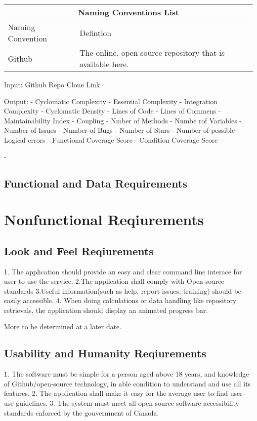 \documentclass{article}
\begin{document}
\begin{tabular}{ |p{6cm}||p{6cm}|  }
 \hline
 \multicolumn{2}{|c|}{Naming Conventions List} \\
 \hline
 Naming        Convention & Defintion\\
 \hline 
Github & The online, open-source repository that is available here. \\
\hline
\end{tabular}

Input: 
Github Repo Clone Link

Output:
- Cyclomatic  Complexity 
- Essential Complexity 
- Integration Complexity 
- Cyclomatic Density
- Lines of Code 
- Lines of Commens
- Maintainability Index
- Coupling 
- Nmber of Methods
- Numbe rof Variables 
- Number of Issues
- Number of Bugs
- Number of Stars
- Number of possible Logical errors 
- Functional Coverage Score
- Condition Coverage Score


- 
\subsection{Functional and Data Requirements }

\newpage
\section{Nonfunctional Reqiurements}

\subsection{Look and Feel Reqiurements}

1. The application should provide an easy and clear command line interace for user to use the service.
2.The application shall comply with Open-source standards
3.Useful information(such as help, report issues, training) should be easily accessible.
4. When doing calculations or  data handling like repository retrievals, the application should display an animated progress bar. 

More to be determined at a later date. 

\subsection{Usability and Humanity Reqiurements}
1. The software must be simple for a person aged above 18 years, and knowledge of Github/open-source technology,  in able condition to understand and use all its features.
2. The application shall make it easy for the average user to find user-use guidelines.
3. The system must meet all open-source software accessibility standards enforced by the gouvernment of Canada. 
\end{document}
